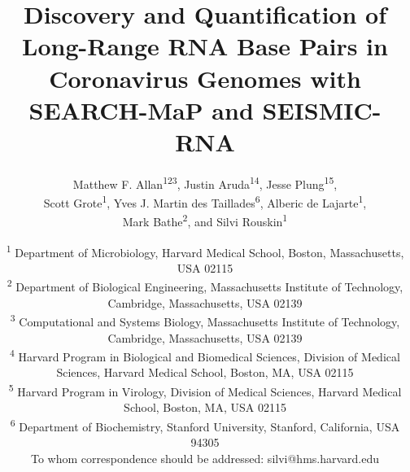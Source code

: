 \documentclass[12pt,a4paper]{article}
\title{Discovery and Quantification of Long-Range RNA Base Pairs in Coronavirus Genomes with SEARCH-MaP and SEISMIC-RNA}
\author{Matthew F. Allan\textsuperscript{123}, Justin Aruda\textsuperscript{14}, Jesse Plung\textsuperscript{15}, \\ Scott Grote\textsuperscript{1}, Yves J. Martin des Taillades\textsuperscript{6}, Alberic de Lajarte\textsuperscript{1}, \\ Mark Bathe\textsuperscript{2}, and Silvi Rouskin\textsuperscript{1\textdagger}}
\date{
	\textsuperscript{1} Department of Microbiology, Harvard Medical School, Boston, Massachusetts, USA 02115 \\
	\textsuperscript{2} Department of Biological Engineering, Massachusetts Institute of Technology, Cambridge, Massachusetts, USA 02139 \\
	\textsuperscript{3} Computational and Systems Biology, Massachusetts Institute of Technology, Cambridge, Massachusetts, USA 02139 \\
	\textsuperscript{4} Harvard Program in Biological and Biomedical Sciences, Division of Medical Sciences, Harvard Medical School, Boston, MA, USA 02115 \\
	\textsuperscript{5} Harvard Program in Virology, Division of Medical Sciences, Harvard Medical School, Boston, MA, USA 02115 \\
	\textsuperscript{6} Department of Biochemistry, Stanford University, Stanford, California, USA 94305 \\
	\textsuperscript{\textdagger} To whom correspondence should be addressed: silvi@hms.harvard.edu \\
}
\begin{document}
\emergencystretch \textwidth

\begin{singlespace}
\maketitle
\end{singlespace}
\newpage

\newpage

\newpage

\newpage

\newpage

\newpage


\newpage
\begin{singlespace}
	
	
\end{singlespace}

\newpage

\end{document}

